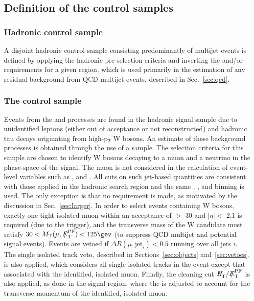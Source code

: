 
\subsection{Definition of the control samples}
\label{sec:controlSelection}

\subsubsection{Hadronic control sample}

A disjoint hadronic control sample consisting predominantly of
multijet events is defined by applying the hadronic pre-selection
criteria and inverting the \alphat and/or \mhtmet requirements for a
given \scalht region, which is used primarily in the estimation of any
residual background from QCD multijet events, described in
Sec.~\ref{sec:qcd}.

\subsubsection{The \texorpdfstring{\mj}{muon plus jets} control sample}
\label{subsec:mucontrolSelection}

Events from the \wj and \ttbar processes are found in the hadronic
signal sample due to unidentified leptons (either out of acceptance or
not reconstructed) and hadronic tau decays originating from
high-p$_{T}$ W bosons. An estimate of these background processes is
obtained through the use of a \mj sample. The selection criteria for
this sample are chosen to identify W bosons decaying to a muon and a
neutrino in the phase-space of the signal. The muon is not considered
in the calculation of event-level variables such as \scalht, \mht and
\alphat. All cuts on such jet-based quantities are consistent with
those applied in the hadronic search region and the same \njet, \nb,
and \scalht binning is used. The only exception is that no \alphat
requirement is made, as motivated by the discussion in
Sec.~\ref{sec:larger}. In order to select events containing W bosons,
exactly one tight isolated muon within an acceptance of \PT $>$ 30
\gev and $|\eta| <$ 2.1 is required (due to the trigger), and the
transverse mass of the W candidate must satisfy $30 < \mt(\mu,\pfmet)
< 125\gev$ (to suppress QCD multijet and potential signal
events). Events are vetoed if $\Delta R(\mu,\textrm{jet}_i) < 0.5$
running over all jets $i$. The single isolated track veto, described
in Sections~\ref{sec:objects} and~\ref{sec:vetoes}, is also
applied, which considers all single isolated tracks in the event
except that associated with the identified, isolated muon. Finally,
the cleaning cut $\mht/\pfmet$ is also applied, as done in the signal
region, where the \pfmet is adjusted to account for the transverse
momentum of the identified, isolated muon.

